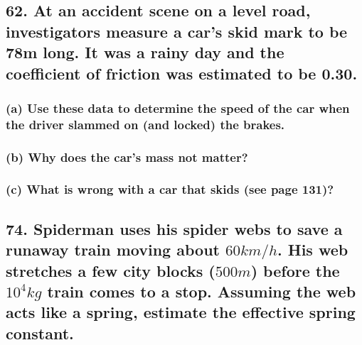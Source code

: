 \documentclass[12pt,a4paper,english]{article}
\begin{document}
\begin{flushleft}
  \subsection{62. At an accident scene on a level road, investigators measure a car's skid mark to be 78m long. It was a rainy day and the coefficient of friction was estimated to be 0.30.}
  \subsubsection{(a) Use these data to determine the speed of the car when the driver slammed on (and locked) the brakes.}
  \subsubsection{(b) Why does the car's mass not matter?}
  \subsubsection{(c) What is wrong with a car that skids (see page 131)?}
  \subsection{74. Spiderman uses his spider webs to save a runaway train moving about $60km/h$. His web stretches a few city blocks ($500 m$) before the $10^4kg$ train comes to a stop. Assuming the web acts like a spring, estimate the effective spring constant.}
\end{flushleft}
\end{document}
